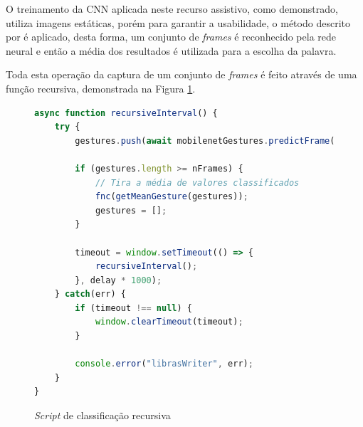 \par O treinamento da CNN aplicada neste recurso assistivo, como demonstrado, utiliza imagens estáticas, porém para garantir a usabilidade, o método descrito por  é aplicado, desta forma, um conjunto de \textit{frames} é reconhecido pela rede neural e então a média dos resultados é utilizada para a escolha da palavra.


\par Toda esta operação da captura de um conjunto de \textit{frames} é feito através de uma função recursiva, demonstrada na Figura \ref{figure:class_recursiva}.


\begin{figure}[H]
    \centering
    \begin{lstlisting}[language=JavaScript]
async function recursiveInterval() {
    try {
        gestures.push(await mobilenetGestures.predictFrame());

        if (gestures.length >= nFrames) {
            // Tira a média de valores classificados
            fnc(getMeanGesture(gestures));
            gestures = [];
        }

        timeout = window.setTimeout(() => {
            recursiveInterval();
        }, delay * 1000);       
    } catch(err) {
        if (timeout !== null) {
            window.clearTimeout(timeout);
        }

        console.error("librasWriter", err);
    }
}
    \end{lstlisting}
    \caption{\textit{Script} de classificação recursiva}
    \label{figure:class_recursiva}
\end{figure}

